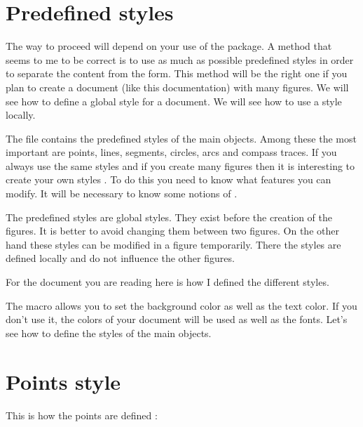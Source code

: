 \section{Predefined styles}\label{custom}
The way to proceed will depend on your use of the package. A method that seems to me to be correct is to use as much as possible predefined styles in order to separate the content from the form. This method will be the right one if you plan to create a document (like this documentation) with many figures. We will see how to define a global style for a document. We will see how to use a style locally.

The file  contains the predefined styles of the main objects. Among these the most important are points, lines, segments, circles, arcs and compass traces.
 If you always use the same styles and if you create many figures then it is interesting to create your own styles . To do this you need to know what features you can modify. It will be necessary to know some notions of \TIKZ.
 
 The predefined styles are global styles. They exist before the creation of the figures. It is better to avoid changing them between two figures. On the other hand these styles can be modified in a figure temporarily. There the styles are defined locally and do not influence the other figures.
 
 For the document you are reading here is how I defined the different styles.

\begin{tkzltxexample}[]
  \tkzSetUpColors[background=white,text=black]  
  \tkzSetUpPoint[size=2,color=teal]
  \tkzSetUpLine[line width=.4pt,color=teal]
  \tkzSetUpCompass[color=orange, line width=.4pt,delta=10]
  \tkzSetUpArc[color=gray,line width=.4pt]
\end{tkzltxexample}

The macro  allows you to set the background color as well as the text color. If you don't use it, the colors of your document will be used as well as the fonts. Let's see how to define the styles of the main objects.

\section{Points style}
This is how the points  are defined :
\begin{tkzltxexample}[]
\end{tkzltxexample}

